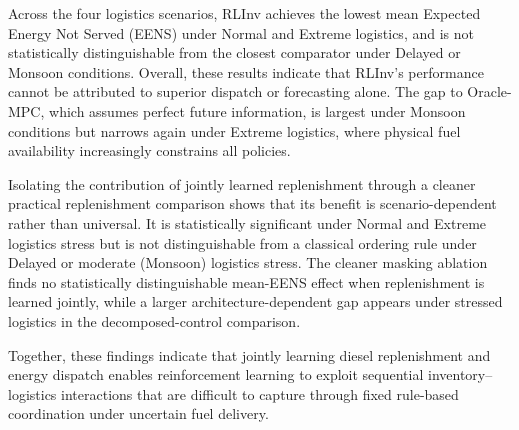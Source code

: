 \begin{doublespacing}
Across the four logistics scenarios, RLInv achieves the lowest mean
Expected Energy Not Served (EENS) under Normal and Extreme logistics,
and is not statistically distinguishable from the closest comparator
under Delayed or Monsoon conditions. Overall,
these results indicate that RLInv's performance cannot be attributed to
superior dispatch or forecasting alone. The gap to Oracle-MPC, which
assumes perfect future information, is largest under Monsoon conditions
but narrows again under Extreme logistics, where physical fuel
availability increasingly constrains all policies.

Isolating the contribution of jointly learned replenishment through a
cleaner practical replenishment comparison shows that its benefit is
scenario-dependent rather
than universal. It is statistically significant under Normal and Extreme
logistics stress but is not distinguishable from a classical ordering
rule under Delayed or moderate (Monsoon)
logistics stress. The cleaner masking ablation finds no statistically
distinguishable mean-EENS effect when replenishment is learned jointly,
while a larger architecture-dependent gap appears under stressed
logistics in the decomposed-control comparison.

Together, these findings indicate that jointly learning diesel
replenishment and energy dispatch enables reinforcement learning to
exploit sequential inventory--logistics interactions that are difficult
to capture through fixed rule-based coordination under uncertain fuel
delivery.

\end{doublespacing}
